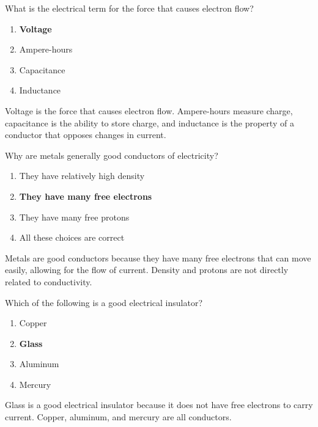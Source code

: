 \begin{tcolorbox}[colback=gray!10!white,colframe=black!75!black,title={T5A05}]
    What is the electrical term for the force that causes electron flow?
    \begin{enumerate}[label=\Alph*),noitemsep]
        \item \textbf{Voltage}
        \item Ampere-hours
        \item Capacitance
        \item Inductance
    \end{enumerate}
\end{tcolorbox}
Voltage is the force that causes electron flow. Ampere-hours measure charge, capacitance is the ability to store charge, and inductance is the property of a conductor that opposes changes in current.

\begin{tcolorbox}[colback=gray!10!white,colframe=black!75!black,title={T5A07}]
    Why are metals generally good conductors of electricity?
    \begin{enumerate}[label=\Alph*),noitemsep]
        \item They have relatively high density
        \item \textbf{They have many free electrons}
        \item They have many free protons
        \item All these choices are correct
    \end{enumerate}
\end{tcolorbox}
Metals are good conductors because they have many free electrons that can move easily, allowing for the flow of current. Density and protons are not directly related to conductivity.

\begin{tcolorbox}[colback=gray!10!white,colframe=black!75!black,title={T5A08}]
    Which of the following is a good electrical insulator?
    \begin{enumerate}[label=\Alph*),noitemsep]
        \item Copper
        \item \textbf{Glass}
        \item Aluminum
        \item Mercury
    \end{enumerate}
\end{tcolorbox}
Glass is a good electrical insulator because it does not have free electrons to carry current. Copper, aluminum, and mercury are all conductors.


